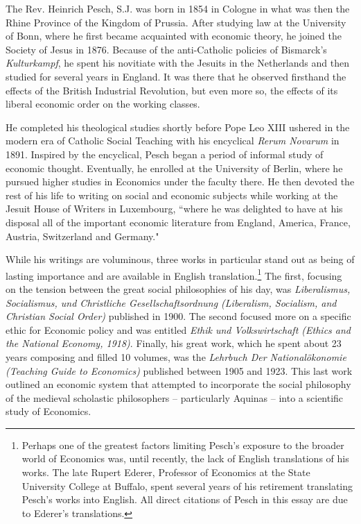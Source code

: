 \documentclass{article}
\begin{document}
The Rev. Heinrich Pesch, S.J. was born in 1854 in Cologne in what was then the Rhine Province of the Kingdom of Prussia.  After studying law at the University of Bonn, where he first became acquainted with economic theory, he joined the Society of Jesus in 1876.  Because of the anti-Catholic policies of Bismarck’s \emph{Kulturkampf}, he spent his novitiate with the Jesuits in the Netherlands and then studied for several years in England.  It was there that he observed firsthand the effects of the British Industrial Revolution, but even more so, the effects of its liberal economic order on the working classes.\medskip

He completed his theological studies shortly before Pope Leo XIII ushered in the modern era of Catholic Social Teaching with his encyclical \emph{Rerum Novarum} in 1891.  Inspired by the encyclical, Pesch began a period of informal study of economic thought.  Eventually, he enrolled at the University of Berlin, where he pursued higher studies in Economics under the faculty there.  He then devoted the rest of his life to writing on social and economic subjects while working at the Jesuit House of Writers in Luxembourg, ``where he was delighted to have at his disposal all of the important economic literature from England, America, France, Austria, Switzerland and Germany." \citep[p. 3]{mulcahy1952}\medskip

While his writings are voluminous, three works in particular stand out as being of lasting importance and are available in English translation.\footnote{Perhaps one of the greatest factors limiting Pesch’s exposure to the broader world of Economics was, until recently, the lack of English translations of his works.  The late Rupert Ederer, Professor of Economics at the State University College at Buffalo, spent several years of his retirement translating Pesch’s works into English.  All direct citations of Pesch in this essay are due to Ederer’s translations.}  The first, focusing on the tension between the great social philosophies of his day, was \emph{Liberalismus, Socialismus, und Christliche Gesellschaftsordnung (Liberalism, Socialism, and Christian Social Order)} published in 1900.  The second focused more on a specific ethic for Economic policy and was entitled \emph{Ethik und Volkswirtschaft (Ethics and the National Economy, 1918)}.  Finally, his great work, which he spent about 23 years composing and filled 10 volumes, was the \emph{Lehrbuch Der National\"{o}konomie (Teaching Guide to Economics)} published between 1905 and 1923.  This last work outlined an economic system that attempted to incorporate the social philosophy of the medieval scholastic philosophers – particularly Aquinas – into a scientific study of Economics.\medskip
\end{document}

